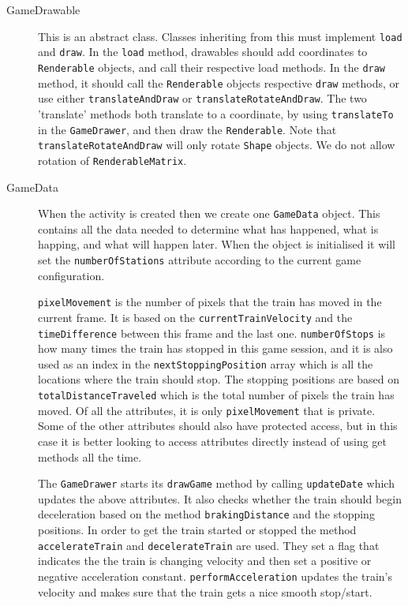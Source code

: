 \begin{description}
\item[GameDrawable] This is an abstract class. Classes inheriting from this must implement \lstinline|load| and \lstinline|draw|. In the \lstinline|load| method, drawables should add coordinates to \lstinline|Renderable| objects, and call their respective load methods. In the \lstinline|draw| method, it should call the \lstinline|Renderable| objects respective \lstinline|draw| methods, or use either \lstinline|translateAndDraw| or \lstinline|translateRotateAndDraw|. The two 'translate' methods both translate to a coordinate, by using \lstinline|translateTo| in the \lstinline|GameDrawer|, and then draw the \lstinline|Renderable|. Note that \lstinline|translateRotateAndDraw| will only rotate \lstinline|Shape| objects. We do not allow rotation of \lstinline|RenderableMatrix|.

\item[GameData] When the activity is created then we create one \lstinline|GameData| object. This contains all the data needed to determine what has happened, what is happing, and what will happen later. When the object is initialised it will set the \lstinline|numberOfStations| attribute according to the current game configuration.

\lstinline|pixelMovement| is the number of pixels that the train has moved in the current frame. It is based on the \lstinline|currentTrainVelocity| and the \lstinline|timeDifference| between this frame and the last one. \lstinline|numberOfStops| is how many times the train has stopped in this game session, and it is also used as an index in the \lstinline|nextStoppingPosition| array which is all the locations where the train should stop. The stopping positions are based on \lstinline|totalDistanceTraveled| which is the total number of pixels the train has moved. Of all the attributes, it is only \lstinline|pixelMovement| that is private. Some of the other attributes should also have protected access, but in this case it is better looking to access attributes directly instead of using get methods all the time.

The \lstinline|GameDrawer| starts its \lstinline|drawGame| method by calling \lstinline|updateDate| which updates the above attributes. It also checks whether the train should begin deceleration based on the method \lstinline|brakingDistance| and the stopping positions. In order to get the train started or stopped the method \lstinline|accelerateTrain| and \lstinline|decelerateTrain| are used. They set a flag that indicates the the train is changing velocity and then set a positive or negative acceleration constant. \lstinline|performAcceleration| updates the train's velocity and makes sure that the train gets a nice smooth stop/start.


\end{description}
